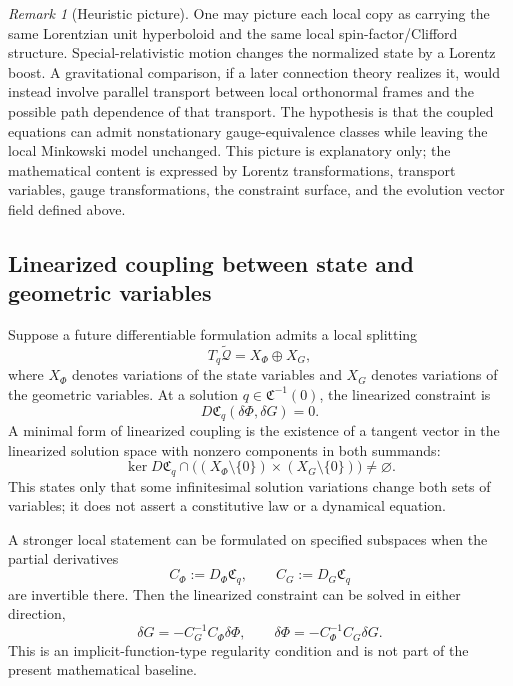 \documentclass[11pt,a4paper]{article}
\theoremstyle{remark}
\newtheorem{remark}[definition]{Remark}
\newcommand{\tQ}{\widetilde{\mathcal Q}}
\begin{document}
\begin{remark}[Heuristic picture]
One may picture each local copy as carrying the same Lorentzian unit hyperboloid and the same local spin-factor/Clifford structure.  Special-relativistic motion changes the normalized state by a Lorentz boost.  A gravitational comparison, if a later connection theory realizes it, would instead involve parallel transport between local orthonormal frames and the possible path dependence of that transport.  The hypothesis is that the coupled equations can admit nonstationary gauge-equivalence classes while leaving the local Minkowski model unchanged.  This picture is explanatory only; the mathematical content is expressed by Lorentz transformations, transport variables, gauge transformations, the constraint surface, and the evolution vector field defined above.
\end{remark}

\subsection{Linearized coupling between state and geometric variables}

Suppose a future differentiable formulation admits a local splitting
\begin{equation}
  T_q\tQ=X_{\Phi}\oplus X_G,
\tag{3.28}
\end{equation}
where \(X_{\Phi}\) denotes variations of the state variables and \(X_G\) denotes variations of the geometric variables.  At a solution \(q\in\mathfrak C^{-1}(0)\), the linearized constraint is
\begin{equation}
  D\mathfrak C_q(\delta\Phi,\delta G)=0.
\tag{3.29}
\end{equation}
A minimal form of linearized coupling is the existence of a tangent vector in the linearized solution space with nonzero components in both summands:
\begin{equation}
  \ker D\mathfrak C_q
  \cap
  \bigl((X_{\Phi}\setminus\{0\})\times(X_G\setminus\{0\})\bigr)
  \neq\varnothing.
\tag{3.30}
\end{equation}
This states only that some infinitesimal solution variations change both sets of variables; it does not assert a constitutive law or a dynamical equation.

A stronger local statement can be formulated on specified subspaces when the partial derivatives
\begin{equation}
  C_{\Phi}:=D_{\Phi}\mathfrak C_q,
  \qquad
  C_G:=D_G\mathfrak C_q
\tag{3.31}
\end{equation}
are invertible there.  Then the linearized constraint can be solved in either direction,
\begin{equation}
  \delta G=-C_G^{-1}C_{\Phi}\delta\Phi,
  \qquad
  \delta\Phi=-C_{\Phi}^{-1}C_G\delta G.
\tag{3.32}\label{eq:linearized-coupling-inverse}
\end{equation}
This is an implicit-function-type regularity condition and is not part of the present mathematical baseline.
\end{document}
